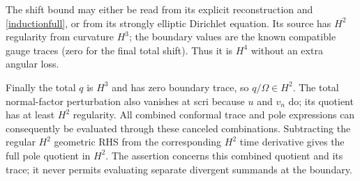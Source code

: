 The shift bound may either be read from its explicit reconstruction and \eqref{inductionfull}, or from its strongly elliptic Dirichlet equation. Its source has $H^2$ regularity from curvature $H^3$; the boundary values are the known compatible gauge traces (zero for the final total shift). Thus it is $H^4$ without an extra angular loss.

Finally the total $q$ is $H^3$ and has zero boundary trace, so $q/\Omega\in H^2$. The total normal-factor perturbation also vanishes at scri because $u$ and $v_n$ do; its quotient has at least $H^2$ regularity. All combined conformal trace and pole expressions can consequently be evaluated through these canceled combinations. Subtracting the regular $H^2$ geometric RHS from the corresponding $H^2$ time derivative gives the full pole quotient in $H^2$. The assertion concerns this combined quotient and its trace; it never permits evaluating separate divergent summands at the boundary.
